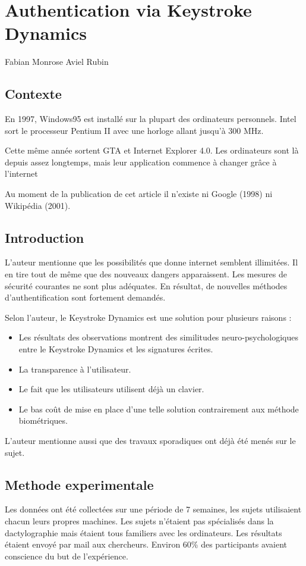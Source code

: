 \section{Authentication via Keystroke Dynamics\cite{monrose1997}}
Fabian Monrose
Aviel Rubin

\subsection{Contexte}
En 1997, Windows95 est installé sur la plupart des ordinateurs personnels. Intel sort le processeur Pentium II avec une horloge allant jusqu’à 300 MHz.

Cette même année sortent GTA et Internet Explorer 4.0. Les ordinateurs sont là depuis assez longtemps, mais leur application commence à changer grâce à l’internet

Au moment de la publication de cet article il n’existe ni Google (1998) ni Wikipédia (2001).

\subsection{Introduction}
L’auteur mentionne que les possibilités que donne internet semblent illimitées. Il en tire tout de même que des nouveaux dangers apparaissent. Les mesures de sécurité courantes ne sont plus adéquates. En résultat, de nouvelles méthodes d’authentification sont fortement demandés.

Selon l’auteur, le Keystroke Dynamics est une solution pour plusieurs raisons :
\begin{itemize}
\item Les résultats des observations montrent des similitudes neuro-psychologiques entre le Keystroke Dynamics et les signatures écrites.
\item La transparence à l’utilisateur.
\item Le fait que les utilisateurs utilisent déjà un clavier.
\item Le bas coût de mise en place d’une telle solution contrairement aux méthode biométriques.
\end{itemize}

L’auteur mentionne aussi que des travaux sporadiques ont déjà été menés sur le sujet.

\subsection{Methode experimentale}
Les données ont été collectées sur une période de 7 semaines, les sujets utilisaient chacun leurs propres machines. Les sujets n’étaient pas spécialisés dans la dactylographie mais étaient tous familiers avec les ordinateurs. Les résultats étaient envoyé par mail aux chercheurs. Environ 60\% des participants avaient conscience du but de l’expérience.


